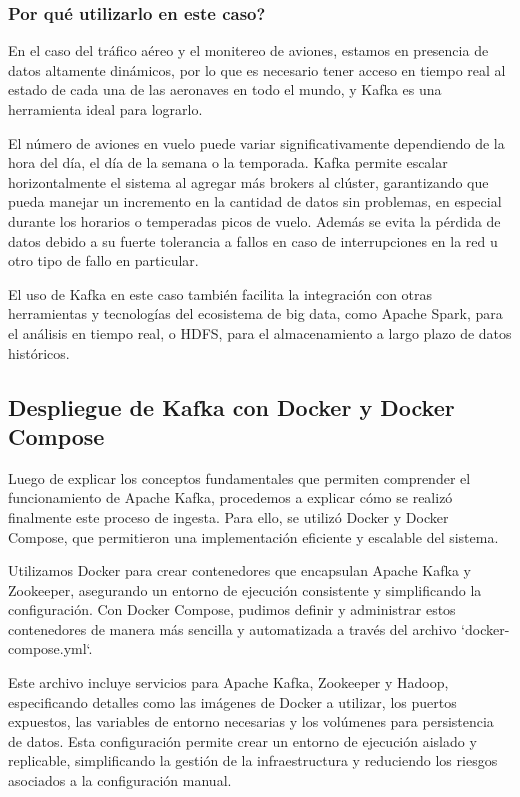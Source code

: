 \documentclass{article}
\begin{document}
\subsubsection{ Por qué utilizarlo en este caso?}

En el caso del tráfico aéreo y el monitereo de aviones, estamos en presencia de datos altamente dinámicos, por lo que es necesario tener acceso en tiempo real al estado de cada una de las aeronaves en todo el mundo, y Kafka es una herramienta ideal para lograrlo.

El número de aviones en vuelo puede variar significativamente dependiendo de la hora del día, el día de la semana o la temporada. Kafka permite escalar horizontalmente el sistema al agregar más brokers al clúster, garantizando que pueda manejar un incremento en la cantidad de datos sin problemas, en especial durante los horarios o temperadas picos de vuelo. Además se evita la pérdida de datos debido a su fuerte tolerancia a fallos en caso de interrupciones en la red u otro tipo de fallo en particular.

El uso de Kafka en este caso también facilita la integración con otras herramientas y tecnologías del ecosistema de big data, como Apache Spark, para el análisis en tiempo real, o HDFS, para el almacenamiento a largo plazo de datos históricos.

\subsection{Despliegue de Kafka con Docker y Docker Compose}

Luego de explicar los conceptos fundamentales que permiten comprender el funcionamiento de Apache Kafka, procedemos a explicar cómo se realizó finalmente este proceso de ingesta. Para ello, se utilizó Docker y Docker Compose, que permitieron una implementación eficiente y escalable del sistema.

Utilizamos Docker para crear contenedores que encapsulan Apache Kafka y Zookeeper, asegurando un entorno de ejecución consistente y simplificando la configuración. Con Docker Compose, pudimos definir y administrar estos contenedores de manera más sencilla y automatizada a través del archivo `docker-compose.yml`.

Este archivo incluye servicios para Apache Kafka, Zookeeper y Hadoop, especificando detalles como las imágenes de Docker a utilizar, los puertos expuestos, las variables de entorno necesarias y los volúmenes para persistencia de datos. Esta configuración permite crear un entorno de ejecución aislado y replicable, simplificando la gestión de la infraestructura y reduciendo los riesgos asociados a la configuración manual.
\end{document}
